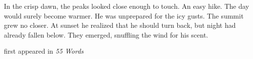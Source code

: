 
In the crisp dawn, the peaks looked close enough to touch. An easy hike.
The day would surely become warmer. He was unprepared for the icy gusts.
The summit grew no closer. At sunset he realized that he should turn
back, but night had already fallen below. They emerged, snuffling the
wind for his scent.

first appeared in \emph{55 Words}
